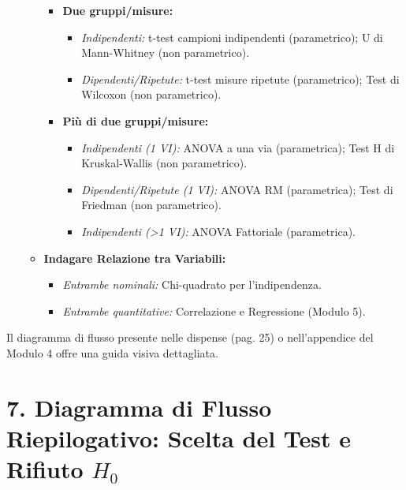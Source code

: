\documentclass[12pt, a4paper]{article}
\newcommand{\Hnull}{H_0} %
\begin{document}
\begin{itemize}
\begin{itemize}
\begin{itemize}
                    \item \textbf{Due gruppi/misure:}
                        \begin{itemize}
                            \item \textit{Indipendenti:} t-test campioni indipendenti (parametrico); U di Mann-Whitney (non parametrico).
                            \item \textit{Dipendenti/Ripetute:} t-test misure ripetute (parametrico); Test di Wilcoxon (non parametrico).
                        \end{itemize}
                    \item \textbf{Più di due gruppi/misure:}
                        \begin{itemize}
                            \item \textit{Indipendenti (1 VI):} ANOVA a una via (parametrica); Test H di Kruskal-Wallis (non parametrico).
                            \item \textit{Dipendenti/Ripetute (1 VI):} ANOVA RM (parametrica); Test di Friedman (non parametrico).
                            \item \textit{Indipendenti (>1 VI):} ANOVA Fattoriale (parametrica).
                        \end{itemize}
                \end{itemize}
            \item \textbf{Indagare Relazione tra Variabili:}
                \begin{itemize}
                    \item \textit{Entrambe nominali:} Chi-quadrato per l'indipendenza.
                    \item \textit{Entrambe quantitative:} Correlazione e Regressione (Modulo 5).
                \end{itemize}
        \end{itemize}
\end{itemize}
Il diagramma di flusso presente nelle dispense (pag. 25) o nell'appendice del Modulo 4 offre una guida visiva dettagliata.
\newpage
\section*{7. Diagramma di Flusso Riepilogativo: Scelta del Test e Rifiuto $\Hnull$}
\end{document}
